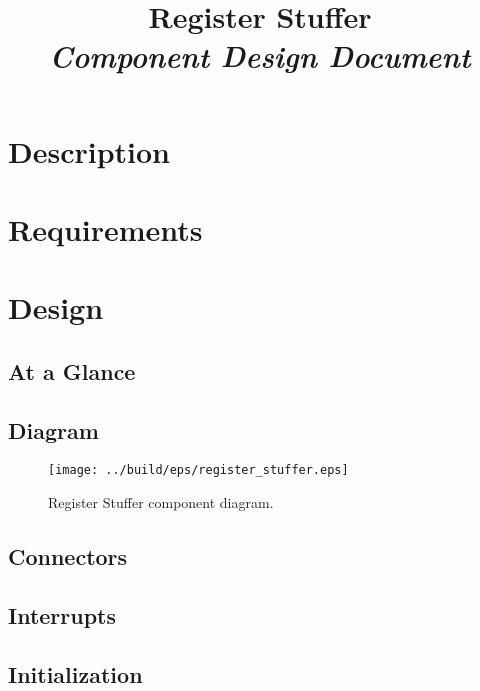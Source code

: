 



\title{\textbf{Register Stuffer} \\
\large\textit{Component Design Document}}
\date{}
\maketitle

\section{Description}


\section{Requirements}


\section{Design}

\subsection{At a Glance}


\subsection{Diagram}
\begin{figure}[H]
  \texttt{[image: ../build/eps/register\_stuffer.eps]}
  \caption{Register Stuffer component diagram.}
\end{figure}

\subsection{Connectors}


\subsection{Interrupts}



\subsection{Initialization}


